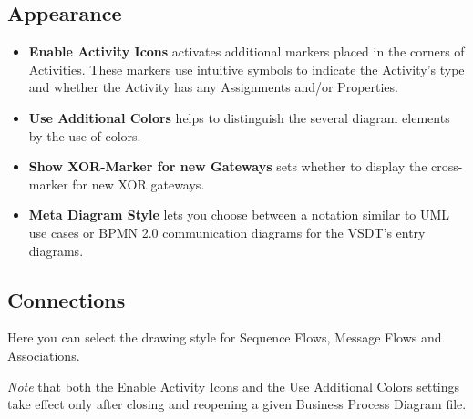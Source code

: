 \subsection{Appearance}
\begin{itemize}
	\item \textbf{Enable Activity Icons} activates additional markers placed in
	the corners of Activities.  These markers use intuitive symbols to indicate
	the Activity's type and whether the Activity has any Assignments and/or
	Properties.
	
	\item \textbf{Use Additional Colors} helps to distinguish the several diagram
	elements by the use of colors.
	
	\item \textbf{Show XOR-Marker for new Gateways} sets whether to display the
	cross-marker for new XOR gateways.
	
	\item \textbf{Meta Diagram Style} lets you choose between a notation similar
	to UML use cases or BPMN 2.0 communication diagrams for the VSDT's entry
	diagrams.
\end{itemize}

\subsection{Connections}
Here you can select the drawing style for Sequence Flows, Message Flows and
Associations.

\emph{Note} that both the Enable Activity Icons and the Use Additional Colors
settings take effect only after closing and reopening a given Business Process
Diagram file.

